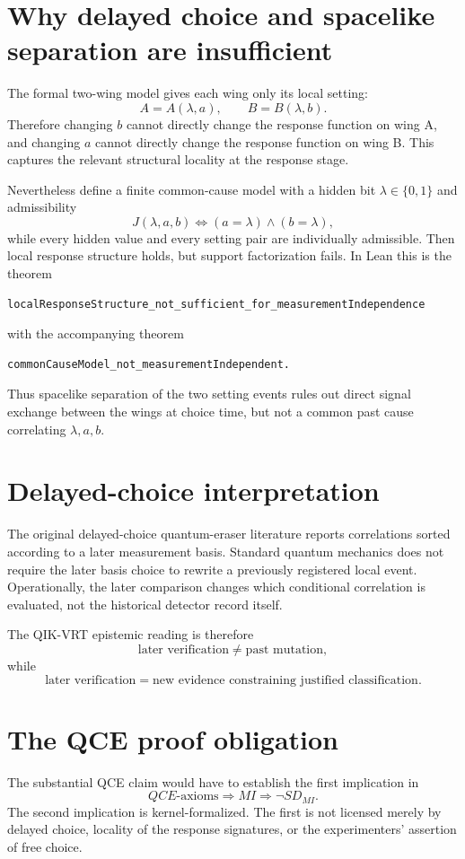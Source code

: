\documentclass[11pt,a4paper]{article}
\begin{document}
\section{Why delayed choice and spacelike separation are insufficient}
The formal two-wing model gives each wing only its local setting:
\[
A=A(\lambda,a),\qquad B=B(\lambda,b).
\]
Therefore changing $b$ cannot directly change the response function on wing A, and changing $a$ cannot directly change the response function on wing B.  This captures the relevant structural locality at the response stage.

Nevertheless define a finite common-cause model with a hidden bit $\lambda\in\{0,1\}$ and admissibility
\[
J(\lambda,a,b)\iff(a=\lambda)\land(b=\lambda),
\]
while every hidden value and every setting pair are individually admissible.  Then local response structure holds, but support factorization fails.  In Lean this is the theorem
\begin{verbatim}
localResponseStructure_not_sufficient_for_measurementIndependence
\end{verbatim}
with the accompanying theorem
\begin{verbatim}
commonCauseModel_not_measurementIndependent.
\end{verbatim}
Thus spacelike separation of the two setting events rules out direct signal exchange between the wings at choice time, but not a common past cause correlating $\lambda,a,b$.

\section{Delayed-choice interpretation}
The original delayed-choice quantum-eraser literature reports correlations sorted according to a later measurement basis.  Standard quantum mechanics does not require the later basis choice to rewrite a previously registered local event.  Operationally, the later comparison changes which conditional correlation is evaluated, not the historical detector record itself.

The QIK-VRT epistemic reading is therefore
\[
\text{later verification}\neq\text{past mutation},
\]
while
\[
\text{later verification}=\text{new evidence constraining justified classification}.
\]

\section{The QCE proof obligation}
The substantial QCE claim would have to establish the first implication in
\[
\boxed{
QCE\text{-axioms}
\Longrightarrow MI
\Longrightarrow \neg SD_{MI}
}.
\]
The second implication is kernel-formalized.  The first is not licensed merely by delayed choice, locality of the response signatures, or the experimenters' assertion of free choice.
\end{document}

